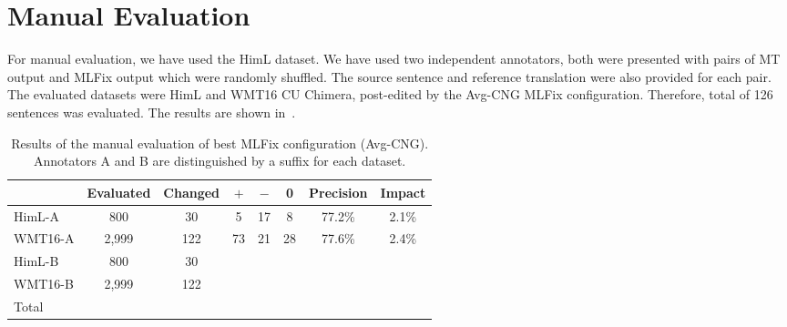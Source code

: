 \section{Manual Evaluation}

For manual evaluation, we have used the HimL dataset. We have used two independent annotators, both were presented with pairs
of MT output and MLFix output which were randomly shuffled. The source sentence and reference translation were also provided for each pair.
The evaluated datasets were HimL and WMT16 CU Chimera, post-edited by the Avg-CNG MLFix configuration. Therefore, total
of 126 sentences was evaluated. The results are shown in~.

\begin{table*}[t]
\centering
\small

\begin{tabular}{l|cc|ccc|cc}
  &  Evaluated  &  Changed  &  $+$  &  $-$  &  0  &  Precision  &  Impact  \\
\hline
HimL-A  &  800  &  30  &  5  &  17  &  8  &  77.2\%  &  2.1\%  \\
WMT16-A  &  2,999  &  122  &  73  &  21  &  28  &  77.6\%  &  2.4\%  \\
HimL-B  &  800  &  30  &    &    &    &    &    \\
WMT16-B  &  2,999  &  122  &    &    &    &    &    \\
\hline
Total & & & & & & & \\
\end{tabular}
\caption{
Results of the manual evaluation of best MLFix configuration (Avg-CNG). Annotators
A and B are distinguished by a suffix for each dataset.
}
\label{maneval-final}
\end{table*}


